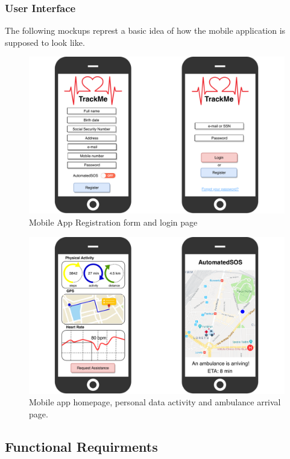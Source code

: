 \documentclass[12pt,a4paper]{article}
\begin{document}
	\subsubsection{User Interface}
	The following mockups represt a basic idea of how the mobile application is supposed to look like.\\
	\begin{figure}[h]
	  \centering
	  \includegraphics[width=1.0\linewidth]{Images/login-registration}
	  \caption{Mobile App Registration form and login page}
	  \label{fig:login-registration}
	\end{figure}
	\begin{figure}
	   	\centering
	   	\includegraphics[width=1.0\linewidth]{Images/pages}
		\caption{Mobile app homepage, personal data activity and ambulance arrival page.}
		\label{fig:pages}
	 \end{figure}
 
    \newpage
   
	\subsection{Functional Requirments}
\end{document}
